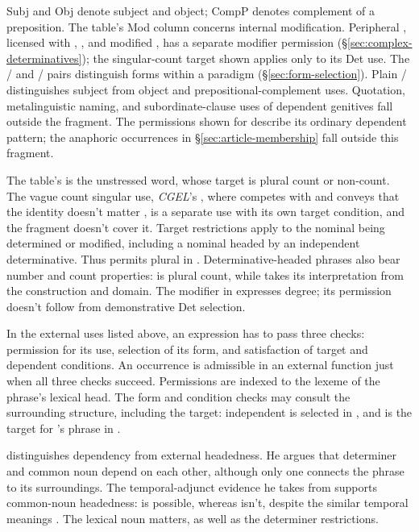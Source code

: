 \documentclass[12pt]{article}
\begin{document}
Subj and Obj denote subject and object; CompP denotes complement of a preposition. The table's Mod column concerns internal modification. Peripheral , licensed with , , and modified , has a separate modifier permission (§\ref{sec:complex-determinatives}); the singular-count target shown applies only to its Det use. The / and / pairs distinguish forms within a paradigm (§\ref{sec:form-selection}). Plain / distinguishes subject from object and prepositional-complement uses. Quotation, metalinguistic naming, and subordinate-clause uses of dependent genitives fall outside the fragment. The permissions shown for  describe its ordinary dependent pattern; the anaphoric occurrences in §\ref{sec:article-membership} fall outside this fragment.

The table's  is the unstressed word, whose target is plural count or non-count. The vague count singular use, \textit{CGEL}'s , where  competes with  and conveys that the identity doesn't matter \citep[380]{huddleston2002}, is a separate use with its own target condition, and the fragment doesn't cover it. Target restrictions apply to the nominal being determined or modified, including a nominal headed by an independent determinative. Thus  permits plural  in . Determinative-headed phrases also bear number and count properties:  is plural count, while  takes its interpretation from the construction and domain. The modifier  in  expresses degree; its permission doesn't follow from demonstrative Det selection.

In the external uses listed above, an expression has to pass three checks: permission for its use, selection of its form, and satisfaction of target and dependent conditions. An occurrence is admissible in an external function just when all three checks succeed. Permissions are indexed to the lexeme of the phrase's lexical head. The form and condition checks may consult the surrounding structure, including the target: independent  is selected in , and  is the target for 's phrase in .

\textcite[7--8]{hudson2004determiners} distinguishes dependency from external headedness. He argues that determiner and common noun depend on each other, although only one connects the phrase to its surroundings. The temporal-adjunct evidence he takes from \textcite{vanlangendonck1994} supports common-noun headedness:  is possible, whereas  isn't, despite the similar temporal meanings \citep[10--12]{hudson2004determiners}. The lexical noun matters, as well as the determiner restrictions.
\end{document}
